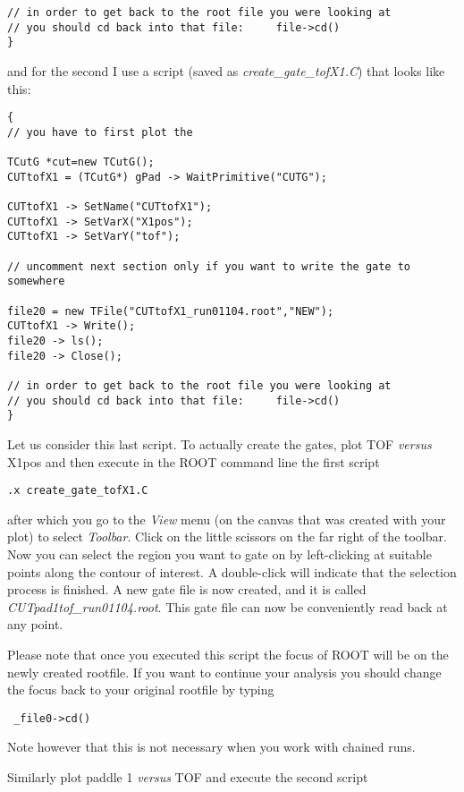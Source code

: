 \documentclass[11pt]{report}
\begin{document}
\begin{enumerate}
\begin{verbatim}
// in order to get back to the root file you were looking at
// you should cd back into that file:     file->cd()
}
\end{verbatim}


and for the second I use a script 
(saved as {\it create\_gate\_tofX1.C}) that looks like this:
\begin{verbatim}
{
// you have to first plot the

TCutG *cut=new TCutG();
CUTtofX1 = (TCutG*) gPad -> WaitPrimitive("CUTG");

CUTtofX1 -> SetName("CUTtofX1"); 
CUTtofX1 -> SetVarX("X1pos");
CUTtofX1 -> SetVarY("tof");

// uncomment next section only if you want to write the gate to somewhere

file20 = new TFile("CUTtofX1_run01104.root","NEW");
CUTtofX1 -> Write();
file20 -> ls();
file20 -> Close();

// in order to get back to the root file you were looking at
// you should cd back into that file:     file->cd()
}
\end{verbatim}

Let us consider this last script. To actually create the gates, plot TOF {\it versus} X1pos
and then execute in the ROOT command line the first script

\begin{verbatim}
.x create_gate_tofX1.C
\end{verbatim}

after which you go to the {\it View} menu (on the canvas that was created with your plot) 
to select {\it Toolbar}. Click on the little scissors on the far right of the toolbar. Now
you can select the region you want to gate on by left-clicking
at suitable points along the contour of interest. A double-click will indicate that the
selection process is finished. A new gate file is now created, and it is called 
{\it CUTpad1tof\_run01104.root}. This gate file can now be conveniently read back at any point.

Please note that once you executed this script the focus of ROOT will be on the newly 
created rootfile. If you want to continue your analysis you should change the focus
back to your original rootfile by typing
\begin{verbatim} _file0->cd() \end{verbatim}
Note however that this is not necessary when you work with chained runs.

Similarly plot paddle 1 {\it versus} TOF and execute the second script


\end{enumerate}
\end{document}
